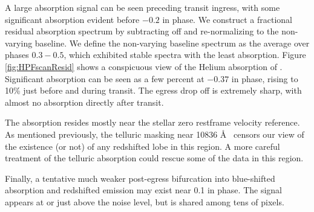 \documentclass[twocolumn]{aastex631}
\begin{document}
A large absorption signal can be seen preceding transit ingress, with some significant absorption evident before $-0.2$ in phase.  We construct a fractional residual absorption spectrum by subtracting off and re-normalizing to the non-varying baseline.  We define the non-varying baseline spectrum as the average over phases $0.3-0.5$, which exhibited stable spectra with the least absorption.  Figure \ref{fig:HPFscanResid} shows a conspicuous view of the Helium absorption of .  Significant absorption can be seen as a few percent at $-0.37$ in phase, rising to 10\% just before and during transit.  The egress drop off is extremely sharp, with almost no absorption directly after transit.

The absorption resides mostly near the stellar zero restframe velocity reference.  As mentioned previously, the telluric masking near 10836 \AA~ censors our view of the existence (or not) of any redshifted lobe in this region.  A more careful treatment of the telluric absorption could rescue some of the data in this region.

Finally, a tentative much weaker post-egress bifurcation into blue-shifted absorption and redshifted emission may exist near 0.1 in phase.  The signal appears at or just above the noise level, but is shared among tens of pixels.
\end{document}
